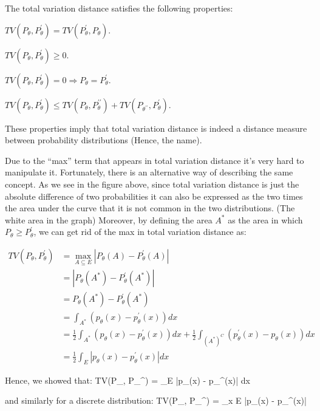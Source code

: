The total variation distance satisfies the following properties:
\bit
\item $TV(P_{\theta}, P_{\theta}^{\prime}) = TV(P_{\theta}^{\prime}, P_{\theta})$.
\item $TV(P_{\theta}, P_{\theta}^{\prime}) \geq 0$.
\item $TV(P_{\theta}, P_{\theta}^{\prime}) =0 \Rightarrow P_{\theta} = P_{\theta}^{\prime}$.
\item $TV(P_{\theta}, P_{\theta}^{\prime}) \leq TV(P_{\theta}, P_{\theta}^{\prime\prime}) + TV(P_{\theta^{\prime\prime}}, P_{\theta}^{\prime})$.
\eit

These properties imply that total variation distance is indeed a distance measure between probability distributions
(Hence, the name).


Due to the ``max'' term that appears in total variation distance it's very hard to manipulate it. Fortunately,
there is an alternative way of describing the same concept. As we see in the figure above, since total variation
distance is just the absolute difference of two probabilities it can also be expressed as the two times the area
under the curve that it is not common in the two distributions. (The white area in the graph) Moreover, by defining
the area $A^*$ as the area in which $P_{\theta} \geq P_{\theta}^{\prime}$, we can get rid of the max in total
variation distance as:

{\setlength{\jot}{10pt}
\begin{align*}
TV(P_{\theta}, P_{\theta}^{\prime}) & = \max_{A \subseteq E} |P_{\theta} (A) - P_{\theta}^{\prime}(A)| \\
&= |P_{\theta}(A^*) - P_{\theta}^{\prime}(A^*)| \\
&= P_{\theta}(A^*) - P_{\theta}^{\prime}(A^*) \\
&= \int_{A^*} (p_{\theta}(x) - p_{\theta}^{\prime}(x)) dx \\
&= \frac{1}{2} \int_{A^*} (p_{\theta}(x) - p_{\theta}^{\prime}(x)) dx + \frac{1}{2} \int_{(A^*)^C}
(p_{\theta}^{\prime}(x) - p_{\theta}(x)) dx \\
&= \frac{1}{2} \int_{E} |p_{\theta}(x) - p_{\theta}^{\prime}(x)| dx
\end{align*}}

Hence, we showed that:
\bse
TV(P_{\theta}, P_{\theta}^{\prime}) =  \int_{E} |p_{\theta}(x) - p_{\theta}^{\prime}(x)| dx
\ese

and similarly for a discrete distribution:
\bse
TV(P_{\theta}, P_{\theta}^{\prime}) =  \sum_{x \in E} |p_{\theta}(x) - p_{\theta}^{\prime}(x)|
\ese

